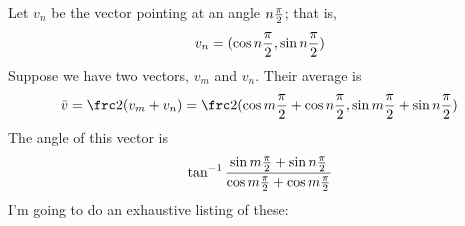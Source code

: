\documentclass{article}
\def\hpi{{\pi\over 2}}
\begin{document}
Let $v_n$ be the vector pointing at an angle $n\hpi$; that is,
$$v_n=(\cos n\hpi,\sin n\hpi)$$
Suppose we have two vectors, $v_m$ and $v_n$.  Their average is 
$$\bar v = \frc2(v_m+v_n) = \frc2(\cos m\hpi+\cos n\hpi, \sin m\hpi + \sin n\hpi)$$
The angle of this vector is
$$\tan^{-1}{\sin m\hpi+\sin n\hpi\over \cos m\hpi+\cos m\hpi}$$
I'm going to do an exhaustive listing of these:
\end{document}
